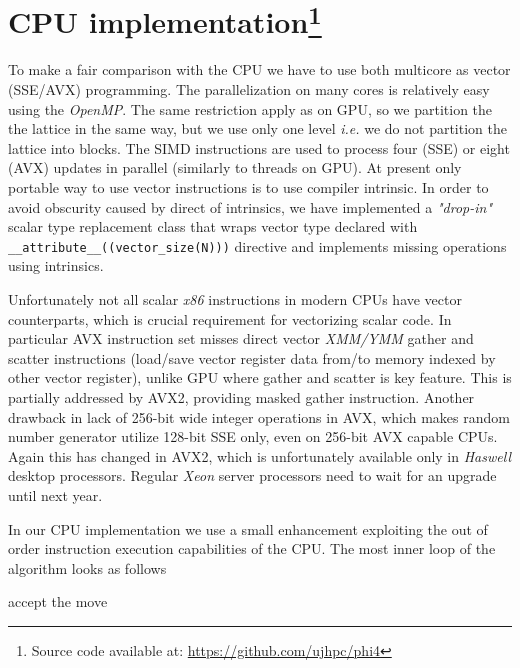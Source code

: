 \documentclass[a4paper]{llncs}
\begin{document}

\section[cpu]{CPU implementation\footnote{Source code available at:
\url{https://github.com/ujhpc/phi4}}}

To make a fair comparison with the CPU we have to use both multicore as vector
(SSE/AVX) programming. The parallelization on many cores is relatively easy
using the \emph{OpenMP}. The same restriction apply as on GPU, so we partition
the the lattice in the same way, but we use only one level \emph{i.e.} we do
not partition the lattice into blocks. The SIMD instructions are used to
process four (SSE) or eight (AVX) updates in parallel (similarly to threads on
GPU). At present only portable way to use vector instructions is to use
compiler intrinsic\cite{intr}. In order to avoid obscurity caused by direct of
intrinsics, we have implemented a \emph{"drop-in"} scalar type replacement
class that wraps vector type declared with
\verb!__attribute__((vector_size(N)))! directive and implements missing
operations using intrinsics.

Unfortunately not all scalar \emph{x86} instructions in modern CPUs have vector
counterparts, which is crucial requirement for vectorizing scalar code. In
particular AVX instruction set misses direct vector \emph{XMM/YMM} gather and
scatter instructions (load/save vector register data from/to memory indexed by
other vector register), unlike GPU where gather and scatter is key feature.
This is partially addressed by AVX2, providing masked gather instruction.
Another drawback in lack of 256-bit wide integer operations in AVX, which makes
random number generator utilize 128-bit SSE only, even on 256-bit AVX capable
CPUs. Again this has changed in AVX2, which is unfortunately available only in
\emph{Haswell} desktop processors. Regular \emph{Xeon} server processors need
to wait for an upgrade until next year.

In our CPU implementation we use a small enhancement exploiting the out of
order instruction execution capabilities of the CPU. The most inner loop of the
algorithm looks as follows

\begin{algorithmic}[1]
    \State accept the move
  \EndIf
\EndFor
\end{algorithmic}
\end{document}
